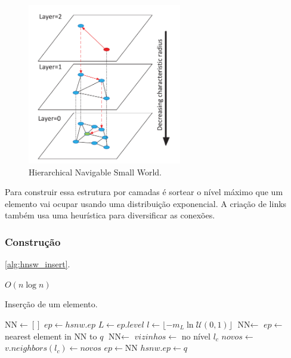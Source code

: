 \begin{figure}
    \centering
    \includegraphics[width=0.6\textwidth]{imgs/hnsw.png}
    \caption{Hierarchical Navigable Small World.}
    \label{fig:hnsw}
\end{figure}

Para construir essa estrutura por camadas é sortear o nível máximo que um elemento vai ocupar usando uma distribuição exponencial. A criação de links também usa uma heurística para diversificar as conexões.

\subsubsection{Construção}

\cref{alg:hnsw_insert}.

$O(n \log n)$

\begin{algorithm}
\caption{Inserção de um elemento.}
\label{alg:hnsw_insert}
\begin{algorithmic}[1]
\State $\text{NN} \gets []$
\State $ep \gets hsnw.ep$
\State $L \gets ep.level$
\State $l \gets \lfloor-m_L\ln\mathcal{U}(0, 1)\rfloor$
\State $\text{NN} \gets$ 
\State $ep \gets$ nearest element in $\text{NN}$ to $q$
\EndFor
{}
\State $\text{NN} \gets$ 
\State $vizinhos \gets $
\State {} no nível $l_c$
\State $novos \gets$ 
\State $v.neighbors(l_c) \gets novos$
\EndIf
\EndFor
\State $ep \gets \text{NN}$
\EndFor
{}
\State $hsnw.ep \gets q$
\EndIf
\EndProcedure
\end{algorithmic}
\end{algorithm}

